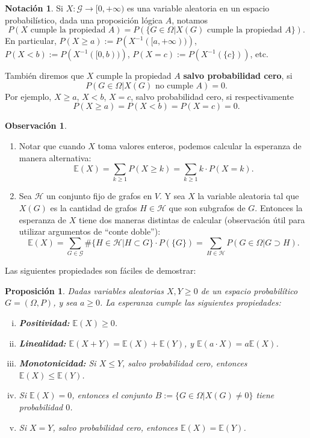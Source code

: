 \documentclass[12pt]{report}
\theoremstyle{plain}
\newtheorem{proposition}[theorem]{Proposición}
\theoremstyle{definition}
\newtheorem{obs}[theorem]{Observación}
\newtheorem{notation}[theorem]{Notación}
\begin{document}
\begin{notation}
Si $X : \mathcal G \to [0, + \infty)$ es una variable aleatoria en un espacio probabilístico, dada una proposición lógica $A$, notamos
\[
    P (X \text{ cumple la propiedad $A$}) = P (\{G \in \Omega | X(G) \text{ cumple la propiedad $A$}\}).
\]
En particular, $P(X \geq a) := P \left(X^{-1} ([a, + \infty ) )\right)$, $P(X < b) := P \left(X^{-1} ([0, b ) )\right)$, $P(X = c) := P \left(X^{-1} (\{c\})\right)$, etc.

También diremos que $X$ cumple la propiedad $A$ \textbf{salvo probabilidad cero}, si
\[
    P(G \in \Omega | X(G) \text{ no cumple $A$}) = 0.
\]
Por ejemplo, $X \geq a$, $X < b$, $X = c$, salvo probabilidad cero, si respectivamente
\[
  P(X \geq a) = P ( X < b) = P (X = c) = 0.
\]
\end{notation}

\begin{obs}
\begin{enumerate}
\item Notar que cuando $X$ toma valores enteros, podemos calcular la esperanza de manera alternativa:
\[
    \mathbb{E} (X) = \sum_{k \geq 1} P(X \geq k) = \sum_{k \geq 1} k \cdot P(X = k).
\]
\item Sea $\mathcal H$ un conjunto fijo de grafos en $V$. Y sea $X$ la variable aleatoria tal que $X(G)$ es la cantidad de grafos $H \in \mathcal H$ que son subgrafos de $G$. Entonces la esperanza de $X$ tiene dos maneras distintas de calcular (observación útil para utilizar argumentos de ``conte doble''):
\[
    \mathbb{E} (X) = \sum_{G \in \mathcal G}\# \{H \in \mathcal H | H \subset G\} \cdot P(\{G\}) = \sum_{H \in \mathcal H} P (G \in \Omega | G \supset H).
\]
\end{enumerate}
\end{obs}

Las siguientes propiedades son fáciles de demostrar:
\begin{proposition}\label{proposition:propiedades de la esperanza}
Dadas variables aleatorias $X,Y \geq 0$ de un espacio probabilítico $G = (\Omega, P)$, y sea $a \geq 0$. La esperanza cumple las siguientes propiedades:
\begin{enumerate}[(i)]
\item \textbf{Positividad:} $\mathbb{E}(X)\geq 0$.
\item \textbf{Linealidad:} $\mathbb{E} (X + Y) = \mathbb{E} (X) + \mathbb{E} (Y)$, y $\mathbb{E}(a \cdot X) = a \mathbb{E} (X)$.
\item \textbf{Monotonicidad:} Si $X \leq Y$, salvo probabilidad cero, entonces $\mathbb{E} (X) \leq \mathbb{E} (Y)$.
\item Si $\mathbb{E} (X) = 0$, entonces el conjunto $B := \{G \in \Omega | X(G) \neq 0\}$ tiene probabilidad $0$.
\item Si $X = Y$, salvo probabilidad cero, entonces $\mathbb{E} (X) = \mathbb{E}(Y)$.
\end{enumerate}
\end{proposition}
\end{document}
